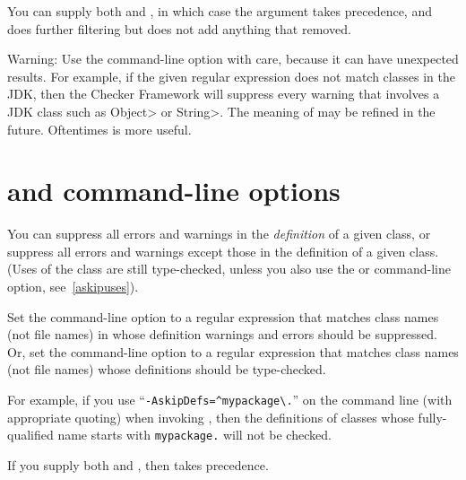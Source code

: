 You can supply both  and , in which case
the  argument takes precedence, and  does
further filtering but does not add anything that  removed.

Warning:  Use the  command-line option with care,
because it can have unexpected results.  For example, if the
given regular expression does not match classes in the JDK, then the
Checker Framework will suppress every warning that involves a JDK class
such as \<Object> or \<String>.  The meaning of  may be
refined in the future.  Oftentimes  is more useful.



\section{ and  command-line options\label{askipdefs}}

You can suppress all errors and warnings in the \emph{definition} of a given
class, or suppress all errors and warnings except those in the definition
of a given class.  (Uses of the class are still type-checked, unless you also use
the  or  command-line option,
see~\ref{askipuses}).

Set the  command-line option to a
regular expression that matches class names (not file names) in whose definition warnings and errors
should be suppressed.
Or, set the  command-line option to a
regular expression that matches class names (not file names) whose
definitions should be type-checked.

For example, if you use
``{\codesize\verb|-AskipDefs=^mypackage\.|}'' on the command line
(with appropriate quoting) when invoking
, then the definitions of
classes whose fully-qualified name starts with \codesize\verb|mypackage.|
will not be checked.

If you supply both  and , then
 takes precedence.

